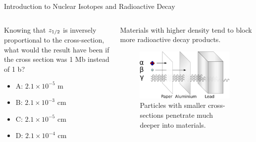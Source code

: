 \documentclass{beamer}
\begin{document}
\begin{frame}{Introduction to Nuclear Isotopes and Radioactive Decay}
\begin{columns}[T]
\begin{column}{0.6\textwidth}
\small
Knowing that $z_{\rm 1/2}$ is inversely proportional to the cross-section, what would the result have been if the cross section was 1 Mb instead of 1 b?
\begin{itemize}
\item A: $2.1 \times 10^{-5}$ m
\item B: $2.1 \times 10^{-3}$ cm
\item C: $2.1 \times 10^{-5}$ cm
\item D: $2.1 \times 10^{-4}$ cm
\end{itemize}
\end{column}
\begin{column}{0.4\textwidth}
\footnotesize
Materials with higher density tend to block more radioactive decay products.
\begin{figure}
\centering
\includegraphics[width=0.95\textwidth]{figures/radioactivity.png}
\caption{\label{fig:radio6} Particles with smaller cross-sections penetrate much deeper into materials.}
\end{figure}
\end{column}
\end{columns}
\end{frame}
\end{document}
